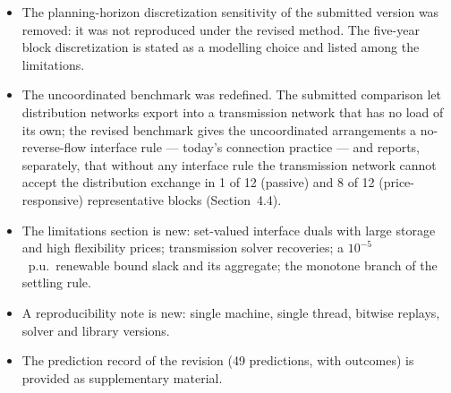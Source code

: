\documentclass[11pt]{article}
\begin{document}
\begin{itemize}[leftmargin=*]
  \item The planning-horizon discretization sensitivity of the submitted version was removed: it was not
    reproduced under the revised method. The five-year block discretization is stated as a modelling
    choice and listed among the limitations.
  \item The uncoordinated benchmark was redefined. The submitted comparison let distribution networks
    export into a transmission network that has no load of its own; the revised benchmark gives the
    uncoordinated arrangements a no-reverse-flow interface rule --- today's connection practice --- and
    reports, separately, that without any interface rule the transmission network cannot accept the
    distribution exchange in 1 of 12 (passive) and 8 of 12 (price-responsive) representative blocks
    (Section~4.4).
  \item The limitations section is new: set-valued interface duals with large storage and high
    flexibility prices; transmission solver recoveries; a $10^{-5}$~p.u.\ renewable bound slack and its
    aggregate; the monotone branch of the settling rule.
  \item A reproducibility note is new: single machine, single thread, bitwise replays, solver and library
    versions.
  \item The prediction record of the revision (49 predictions, with outcomes) is provided as
    supplementary material.
\end{itemize}
\end{document}
